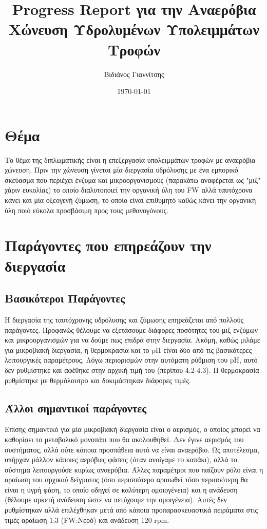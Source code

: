\documentclass[11pt]{article}
\author{Βιδιάνος Γιαννίτσης}
\date{\today}
\title{Progress Report για την Αναερόβια Χώνευση Υδρολυμένων Υπολειμμάτων Τροφών}
\begin{document}
\maketitle

\section{Θέμα}
\label{sec:orge0fb678}
Το θέμα της διπλωματικής είναι η επεξεργασία υπολειμμάτων τροφών με αναερόβια χώνευση. Πριν την χώνευση γίνεται μία διεργασία υδρόλυσης με ένα εμπορικό σκεύασμα που περιέχει ένζυμα και μικροοργανισμούς (παρακάτω αναφέρεται ως "μιξ" χάριν ευκολίας) το οποίο διαλυτοποιεί την οργανική ύλη του FW αλλά ταυτόχρονα κάνει και μία οξεογενή ζύμωση, το οποίο είναι επιθυμητό καθώς κάνει την οργανική ύλη ποιό εύκολα προσβάσιμη προς τους μεθανογόνους.

\section{Παράγοντες που επηρεάζουν την διεργασία}
\label{sec:org630ce13}
\subsection{Βασικότεροι Παράγοντες}
\label{sec:org9cf17af}
Η διεργασία της ταυτόχρονης υδρόλυσης και ζύμωσης επηρεάζεται από πολλούς παράγοντες. Προφανώς θέλουμε να εξετάσουμε διάφορες ποσότητες του μιξ ενζύμων και μικροοργανισμών για να δούμε πως επιδρά στην διεργασία. Ακόμη, καθώς μιλάμε για μικροβιακή διεργασία, η θερμοκρασία και το pH είναι δύο από τις βασικότερες λειτουργικές παραμέτρους. Λόγω περιορισμών στην αυτόματη ρύθμιση του pH, αυτό δεν ρυθμίστηκε και αφέθηκε στην αρχική τιμή του (περίπου 4.2-4.3). Η θερμοκρασία ρυθμίστηκε με θερμόλουτρο και δοκιμάστηκαν διάφορες τιμές.

\subsection{Άλλοι σημαντικοί παράγοντες}
\label{sec:org13a91c5}
Επίσης σημαντικό για μία μικροβιακή διεργασία είναι ο αερισμός, ο οποίος μπορεί να καθορίσει το μεταβολικό μονοπάτι που θα ακολουθηθεί. Δεν έγινε αερισμός του συστήματος, αλλά ούτε κάποια προσπάθεια αυτό να είναι αναερόβιο. Ως αποτέλεσμα, υπήρχαν μάλλον κάποιες αερόβιες φάσεις (όταν ανοίγαμε το καπάκι), αλλά το σύστημα λειτουργούσε κυρίως αναερόβια. Άλλες παραμέτροι που παίζουν ρόλο είναι η αραίωση του αρχικού δείγματος (όσο περισσότερο αραιωθεί τόσο περισσότερη θα είναι η υγρή φάση, το οποίο οδηγεί σε καλύτερη ομοιογένεια) και η ανάδευση (θέλουμε αρκετή ανάδευση ώστε να πετύχουμε την ομοιγένεια). Αυτές δεν ρυθμίστηκαν αλλά επιλέχθηκαν μετά από κάποια προπαρασκευαστικά πειράματα στις τιμές αραίωση 1:3 (FW:Νερό) και ανάδευση 120 rpm.
\end{document}
